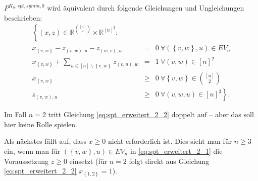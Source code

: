 \documentclass[10p,a4paper,BCOR = 12mm, DIV=15]{scrbook}
\begin{document}
{\begin{Le}
\label{le:spt_erweitert_2}
$P^{K_n, spt, symm, 0}$ wird äquivalent durch folgende Gleichungen und Ungleichungen beschrieben:
\begin{eqnarray}
\left\{(x, z)\in\mathbb{R}^{[n]\choose 2}\times \mathbb{R}^{[n]^{\underline{3}}}:\right. & & \nonumber \\
x_{\left\{v, w\right\}} - z_{\left(v, w\right), u} - z_{\left(w, v\right), u} & = & 0\ \forall \left(\left\{v, w\right\}, u\right)\in EV_n \label{eq:spt_erweitert_2_1} 
\\
x_{\left\{v, w\right\}} + \sum_{u\in[n]\backslash\left\{v, w\right\}} z_{\left(v, u\right), w} & = & 1\ \forall \left(v, w\right)\in [n]^{\underline{2}} \label{eq:spt_erweitert_2_2} 
\\
x_{\left\{v, w\right\}} & \geq & 0\ \forall \left\{v, w\right\}\in {[n] \choose 2} \nonumber \\
z_{\left(v, w\right), u} & \geq & \left.0\ \forall \left(v, w, u\right)\in [n]^{\underline{3}} \nonumber \right\}.
\end{eqnarray}
\end{Le}

\begin{Bem}
Im Fall $n=2$ tritt Gleichung \eqref{eq:spt_erweitert_2_2} doppelt auf -- aber das soll hier keine Rolle spielen.
\end{Bem}

Als nächstes fällt auf, dass $x\geq 0$ nicht erforderlich ist. Dies sieht man für $n\geq 3$ ein, wenn man für $\left(\left\{v, w\right\}, u\right)\in EV_n$ in \eqref{eq:spt_erweitert_2_1} die Voraussetzung $z\geq 0$ einsetzt (für $n=2$ folgt direkt aus Gleichung \eqref{eq:spt_erweitert_2_2} $x_{\left\{1, 2\right\}} = 1$).

}
\end{document}
